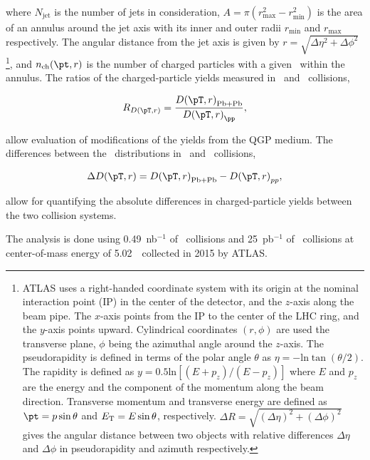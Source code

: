 where $N_{\mathrm{jet}}$ is the number of jets in consideration, $A = \pi (r_{\mathrm{max}}^2 - r_{\mathrm{min}}^2) $ is the area of an annulus around the jet axis with its inner and outer radii $r_{\mathrm{min}}$ and $r_{\mathrm{max}}$ respectively. The angular distance from the jet axis is given by $r = \sqrt{\Delta \eta^2 + \Delta \phi^2}$ \footnote{ATLAS uses a right-handed coordinate system with its origin at the nominal interaction point (IP) in the center of the detector, and the $z$-axis along the beam pipe. The $x$-axis points from the IP to the center of the LHC ring, and the $y$-axis points upward. Cylindrical coordinates $(r, \phi)$ are used the transverse plane, $\phi$ being the azimuthal angle around the $z$-axis. The pseudorapidity is defined in terms of the polar angle $\theta$ as $\eta = - \text{ln} \tan (\theta/2)$. The rapidity is defined as $y = 0.5\text{ln}[(E + p_z)/(E-p_z)]$ where $E$ and $p_z$ are the energy and the component of the momentum along the beam direction.  Transverse momentum and transverse energy are defined as $\pt = p \sin\theta$ and $\mbox{$E_{\mathrm{T}}$} = E \sin\theta$, respectively. $\Delta R = \sqrt{(\Delta \eta )^2 + (\Delta \phi)^2}$ gives the angular distance between two objects with relative differences $\Delta \eta$ and $\Delta \phi$ in pseudorapidity and azimuth respectively.}, and $n_{\mathrm{ch}}(\pt, r)$ is the number of charged particles with a given \pt\ within the annulus. The ratios of the charged-particle yields measured in \pbpb\ and \pp\ collisions,

\begin{align*}
   \RDptr = \frac{\Dptr_\mathrm{Pb+Pb}}{\Dptr_{\pp}},
\end{align*}

allow evaluation of modifications of the yields from the QGP medium. The differences between the \Dptr\ distributions in \pbpb\ and \pp\ collisions, 

\begin{align*}
   \Delta \Dptr = \Dptr_\mathrm{Pb+Pb} - \Dptr_{pp},
\end{align*}

allow for quantifying the absolute differences in charged-particle yields between the two collision systems. 

The analysis is done using 0.49~nb$^{-1}$ of \pbpb\ collisions and 
25~pb$^{-1}$ of \pp\ collisions at center-of-mass energy of 5.02~\TeV\ collected in 2015 by ATLAS. 


